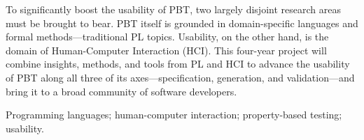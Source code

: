 

To significantly boost the usability of PBT, two largely disjoint
research areas must be
brought to bear.  PBT itself is grounded in domain-specific languages
and formal methods---traditional PL topics.  Usability, on the other
hand, is the domain of Human-Computer Interaction (HCI).
%
This four-year project will combine insights, methods, and tools from
PL and HCI to advance the usability of PBT along all three of its
axes---specification, generation, and validation---and bring it to a
broad community of software developers.

\smallskip

 Programming languages; human-computer
interaction; property-based testing; usability.

